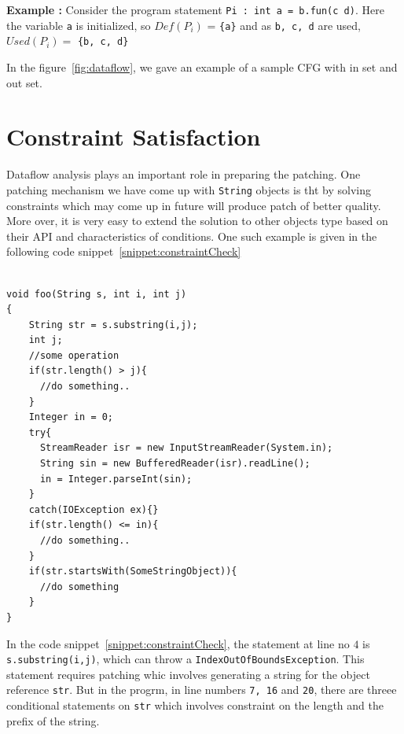 \textbf{Example : } Consider the program statement \texttt{Pi : int a = b.fun(c
d)}.
Here the variable \texttt{a} is initialized, so $Def(P_i)$ = \texttt{\{a\}} and
as
\texttt{b, c, d} are used, $Used(P_i) =$ \texttt{\{b, c, d\}}

In the figure~\ref{fig:dataflow}, we gave an example of a sample CFG with in set
and out set.


\section{Constraint Satisfaction}
\label{sec:constraintSatisfaction}

Dataflow analysis plays an important role in preparing the patching. One
patching mechanism we have come up with \texttt{String} objects is tht by
solving constraints which may come up in future will produce patch of better
quality. More over, it is very easy to extend the solution to other objects type
based on their API and characteristics of conditions. One such example is given
in the following code snippet~\ref{snippet:constraintCheck}

\onehalfspacing
\lstset{language=Java, caption=Better patching mechanism with constraint
satisfaction, label = snippet:constraintCheck}
\begin{lstlisting}

void foo(String s, int i, int j)
{
	String str = s.substring(i,j);
	int j;
	//some operation
	if(str.length() > j){
	  //do something..
	}
	Integer in = 0;
	try{
	  StreamReader isr = new InputStreamReader(System.in);
	  String sin = new BufferedReader(isr).readLine();
	  in = Integer.parseInt(sin);
	}
	catch(IOException ex){}
	if(str.length() <= in){
	  //do something..
	}
	if(str.startsWith(SomeStringObject)){
	  //do something
	}
}

\end{lstlisting}

In the code snippet~\ref{snippet:constraintCheck}, the statement at line no $4$
is \texttt{s.substring(i,j)}, which can throw a
\texttt{IndexOutOfBoundsException}. This statement requires patching whic
involves generating a string for the object reference \texttt{str}. But in the
progrm, in line numbers \texttt{7, 16} and \texttt{20}, there are threee
conditional statements on \texttt{str} which involves constraint on the length
and the prefix of the string.